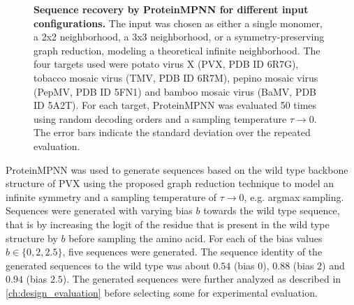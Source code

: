 \begin{figure}
\centering

\caption{\textbf{Sequence recovery by ProteinMPNN for different input configurations.} The input was chosen as either a single monomer, a 2x2 neighborhood, a 3x3 neighborhood, or a symmetry-preserving graph reduction, modeling a theoretical infinite neighborhood. The four targets used were potato virus X (PVX, PDB ID 6R7G), tobacco mosaic virus (TMV, PDB ID 6R7M), pepino mosaic virus (PepMV, PDB ID 5FN1) and bamboo mosaic virus (BaMV, PDB ID 5A2T). For each target, ProteinMPNN was evaluated 50 times using random decoding orders and a sampling temperature $\tau\rightarrow 0$. The error bars indicate the standard deviation over the repeated evaluation. }
\label{fig:pmpnn_comp}
\end{figure}

ProteinMPNN was used to generate sequences based on the wild type backbone structure of PVX using the proposed graph reduction technique to model an infinite symmetry and a sampling temperature of $\tau\rightarrow 0$, e.g. argmax sampling. Sequences were generated with varying bias $b$ towards the wild type sequence, that is by increasing the logit of the residue that is present in the wild type structure by $b$ before sampling the amino acid. For each of the bias values $b \in \{0, 2, 2.5\}$, five sequences were generated. The sequence identity of the generated sequences to the wild type was about $0.54$ (bias $0$), $0.88$ (bias $2$) and $0.94$ (bias $2.5$). The generated sequences were further analyzed as described in \autoref{ch:design_evaluation} before selecting some for experimental evaluation. 